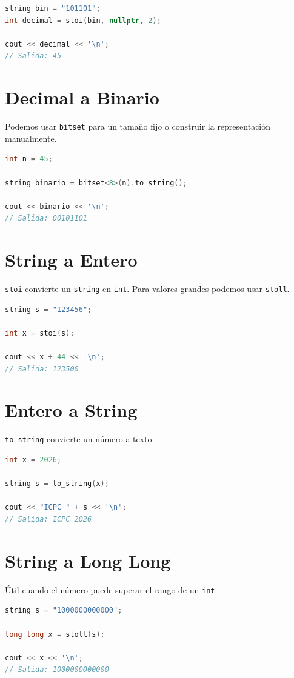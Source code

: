 \documentclass[10pt,twocolumn,letterpaper]{report}
\begin{document}
\begin{lstlisting}[language=C++]
string bin = "101101";
int decimal = stoi(bin, nullptr, 2);

cout << decimal << '\n';
// Salida: 45
\end{lstlisting}

\section{Decimal a Binario}
Podemos usar \texttt{bitset} para un tamaño fijo o construir la representación
manualmente.

\begin{lstlisting}[language=C++]
int n = 45;

string binario = bitset<8>(n).to_string();

cout << binario << '\n';
// Salida: 00101101
\end{lstlisting}

\section{String a Entero}
\texttt{stoi} convierte un \texttt{string} en \texttt{int}. Para valores
grandes podemos usar \texttt{stoll}.

\begin{lstlisting}[language=C++]
string s = "123456";

int x = stoi(s);

cout << x + 44 << '\n';
// Salida: 123500
\end{lstlisting}

\section{Entero a String}
\texttt{to\_string} convierte un número a texto.

\begin{lstlisting}[language=C++]
int x = 2026;

string s = to_string(x);

cout << "ICPC " + s << '\n';
// Salida: ICPC 2026
\end{lstlisting}

\section{String a Long Long}
Útil cuando el número puede superar el rango de un \texttt{int}.

\begin{lstlisting}[language=C++]
string s = "1000000000000";

long long x = stoll(s);

cout << x << '\n';
// Salida: 1000000000000
\end{lstlisting}
\end{document}
